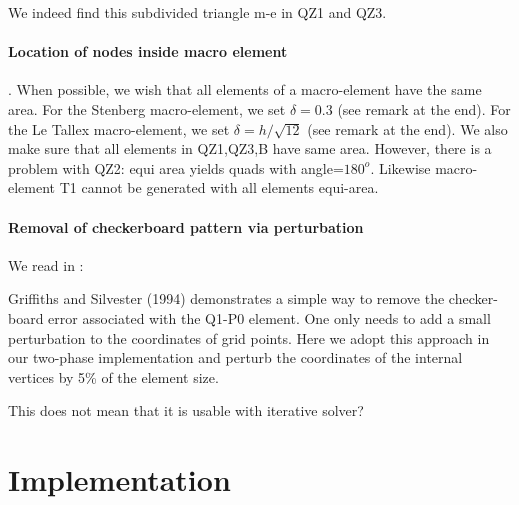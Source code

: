 We indeed find this subdivided triangle m-e in QZ1 and QZ3. 

\paragraph{Location of nodes inside macro element}.
When possible, we wish that all elements of a macro-element have the same area. 
For the Stenberg macro-element, we set $\delta =0.3$ (see remark at the end).
For the Le Tallex macro-element, we set $\delta=h/\sqrt{12}$ (see remark at the end).
We also make sure that all elements in QZ1,QZ3,B have same area.
However, there is a problem with QZ2: equi area yields quads with angle=$180^o$. 
Likewise macro-element T1 cannot be generated with all elements equi-area.


\paragraph{Removal of checkerboard pattern via perturbation}

We read in \textcite{lumh24}:
\begin{displayquote}
{\color{MidnightBlue}
Griffiths and Silvester (1994) demonstrates a simple way to remove the checker-board 
error associated with the Q1-P0 element. One only needs to add a small perturbation 
to the coordinates of grid points. Here we adopt this approach in our two-phase 
implementation and perturb the coordinates of the internal vertices by 5\% of the
element size.
}
\end{displayquote}


This does not mean that it is usable with iterative solver?










\section*{Implementation}

